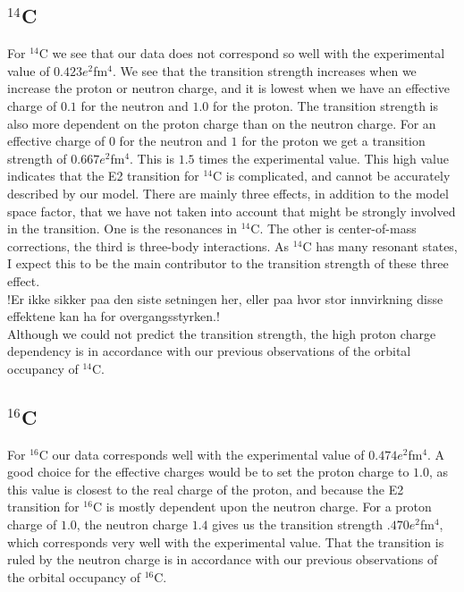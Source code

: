 \subsection{$^{14}$C}

For $^{14}$C we see that our data does not correspond so well with the
experimental value of $0.423 e^2$fm$^4$. We see that the transition strength
increases when we increase the proton or neutron charge, and it is lowest when
we have an effective charge of $0.1$ for the neutron and $1.0$ for the proton.
The transition strength is also more dependent on the proton charge than on the
neutron charge. For an effective charge of $0$ for the neutron and $1$ for the
proton we get a transition strength of $0.667 e^2$fm$^4$. This is $1.5$ times
the experimental value. This high value indicates that the E2 transition for
$^{14}$C is complicated, and cannot be accurately described by our model. There
are mainly three effects, in addition to the model space factor, that we have
not taken into account that might be strongly involved in the transition. One
is the resonances in $^{14}$C. The other is center-of-mass corrections, the
third is three-body interactions. As $^{14}$C has many resonant states, I
expect this to be the main contributor to the transition strength of these
three effect.
\\ !Er ikke sikker paa den siste setningen her, eller paa hvor stor innvirkning disse effektene kan ha for overgangsstyrken.! \\
Although we could
not predict the transition strength, the high proton charge dependency
is in accordance with our previous observations of the orbital occupancy of
$^{14}$C.

\subsection{$^{16}$C}

For $^{16}$C our data corresponds well with the experimental value of $0.474
e^2$fm$^4$. A good choice for the effective charges would be to set the proton
charge to $1.0$, as this value is closest to the real charge of the proton, and
because the E2 transition for $^{16}$C is mostly dependent upon the neutron
charge. For a proton charge of $1.0$, the neutron charge $1.4$ gives us the
transition strength $.470 e^2$fm$^4$, which corresponds very well with the
experimental value. That the transition is ruled by the neutron charge is in
accordance with our previous observations of the orbital occupancy of $^{16}$C.


